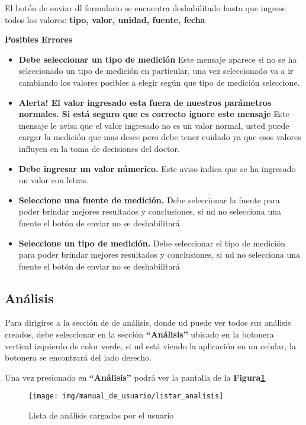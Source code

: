 El botón de enviar dl formulario se encuentra deshabilitado hasta que ingrese todos los valores:
\textbf{tipo, valor, unidad, fuente, fecha}


\textbf{Posibles Errores}
\begin{itemize}
	\item \textbf{Debe seleccionar un tipo de medición} Este mensaje aparece si no se ha seleccionado un tipo de medición en particular, una vez seleccionado va a ir cambiando los valores posibles a elegir según que tipo de medición seleccione.
	\item \textbf{Alerta! El valor ingresado esta fuera de nuestros parámetros normales. Si está seguro que es correcto ignore este mensaje} Este mensaje le avisa que el valor ingresado no es un valor normal, usted puede cargar la medición que mas desee pero debe tener cuidado ya que esos valores influyen en la toma de decisiones del doctor.
	\item \textbf{Debe ingresar un valor númerico.} Este aviso indica que se ha ingresado un valor con letras.
	\item \textbf{Seleccione una fuente de medición.} Debe seleccionar la fuente para poder brindar mejores resultados y conclusiones, si ud no selecciona una fuente el botón de enviar no se deshabilitará
	\item \textbf{Seleccione un tipo de medición.} Debe seleccionar el tipo de medición para poder brindar mejores resultados y conclusiones, si ud no selecciona una fuente el botón de enviar no se deshabilitará
\end{itemize}


\subsection{Análisis}
Para dirigirse a la sección de  de análisis, donde ud puede ver todos sus análisis creados, debe seleccionar en la sección \textbf{``Análisis''} ubicado en la botonera vertical izquierdo de color verde, si ud está viendo la aplicación en un celular, la botonera se encontrará del lado derecho.

Una vez presionado en \textbf{``Análisis''} podrá ver la pantalla de la \textbf{Figura\ref{mu-listar_analisis}}


\begin{figure}
	\centering
	\texttt{[image: img/manual\_de\_usuario/listar\_analisis]}
	\caption{Lista de análisis cargadas por el usuario}
	\label{mu-listar_analisis}
\end{figure}
 
